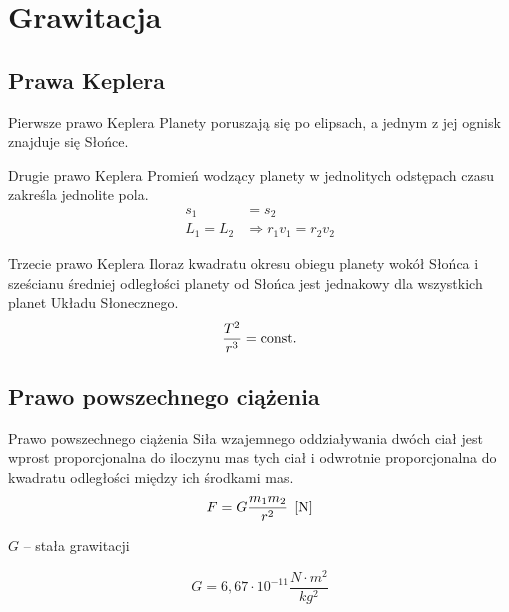 \chapter{Grawitacja}

\section{Prawa Keplera}

\begin{law}{Pierwsze prawo Keplera}
  Planety poruszają się po elipsach, a jednym z jej ognisk znajduje się Słońce.
\end{law}

\begin{law}{Drugie prawo Keplera}
  Promień wodzący planety w jednolitych odstępach czasu zakreśla jednolite pola.
  \begin{align*}
    s_1 &= s_2\\
    L_1 = L_2 &\Rightarrow r_1 v_1 = r_2 v_2
  \end{align*}
\end{law}

\begin{law}{Trzecie prawo Keplera}
  Iloraz kwadratu okresu obiegu planety wokół Słońca i sześcianu średniej odległości planety od
  Słońca jest jednakowy dla wszystkich planet Układu Słonecznego.
  \begin{equation*}
    \frac{T^2}{r^3} = \operatorname{const.}
  \end{equation*}
\end{law}

\section{Prawo powszechnego ciążenia}
\begin{law}{Prawo powszechnego ciążenia}
  Siła wzajemnego oddziaływania dwóch ciał jest wprost proporcjonalna do iloczynu mas tych ciał i
  odwrotnie proporcjonalna do kwadratu odległości między ich środkami mas.
  \begin{equation}
    F = G\frac{m_1 m_2}{r^2} \;\left[\mathrm{N}\right]
  \end{equation}
  \begin{symbols}
    \item $G$ -- stała grawitacji
  \end{symbols}
  \begin{equation*}
    G = 6,67 \cdot 10^{-11} \unit{\frac{N \cdot m^2}{kg^2}}
  \end{equation*}
\end{law}

